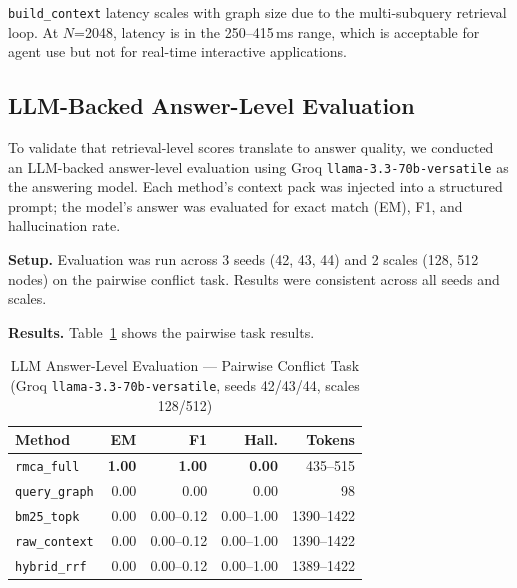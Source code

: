 \documentclass[conference]{IEEEtran}
\begin{document}
\texttt{build\_context} latency scales with graph size due to the multi-subquery retrieval
loop. At $N$=2048, latency is in the 250--415\,ms range, which is acceptable for agent use
but not for real-time interactive applications.


\subsection{LLM-Backed Answer-Level Evaluation}

To validate that retrieval-level scores translate to answer quality, we conducted an
LLM-backed answer-level evaluation using Groq \texttt{llama-3.3-70b-versatile} as the
answering model. Each method's context pack was injected into a structured prompt; the
model's answer was evaluated for exact match (EM), F1, and hallucination rate.

\textbf{Setup.} Evaluation was run across 3 seeds (42, 43, 44) and 2 scales (128, 512 nodes)
on the pairwise conflict task. Results were consistent across all seeds and scales.

\textbf{Results.} Table~\ref{tab:groq_pairwise} shows the pairwise task results.

\begin{table}[htbp]
\caption{LLM Answer-Level Evaluation --- Pairwise Conflict Task\\
(Groq \texttt{llama-3.3-70b-versatile}, seeds 42/43/44, scales 128/512)}
\label{tab:groq_pairwise}
\centering
\begin{tabular}{lrrrr}
\toprule
\textbf{Method} & \textbf{EM} & \textbf{F1} & \textbf{Hall.} & \textbf{Tokens} \\
\midrule
\texttt{rmca\_full}  & \textbf{1.00} & \textbf{1.00} & \textbf{0.00} & 435--515 \\
\texttt{query\_graph} & 0.00 & 0.00 & 0.00 & 98 \\
\texttt{bm25\_topk}  & 0.00 & 0.00--0.12 & 0.00--1.00 & 1390--1422 \\
\texttt{raw\_context} & 0.00 & 0.00--0.12 & 0.00--1.00 & 1390--1422 \\
\texttt{hybrid\_rrf} & 0.00 & 0.00--0.12 & 0.00--1.00 & 1389--1422 \\
\bottomrule
\end{tabular}
\end{table}
\end{document}

